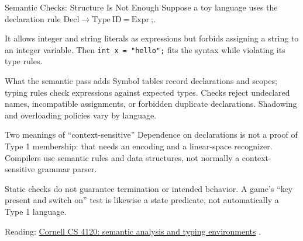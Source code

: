 \documentclass[10pt]{beamer}
\newcommand{\paperlink}[2]{%
  \href{#1}{\textcolor{blue!65!black}{#2}}%
}
\begin{document}
\begin{frame}{Semantic Checks: Structure Is Not Enough}
  \small
  Suppose a toy language uses the declaration rule
  $\mathrm{Decl}\to\mathrm{Type}\ \mathrm{ID}\ \texttt{=}\
      \mathrm{Expr}\ \texttt{;}$.
  \par\smallskip
  It allows integer and string literals as expressions but forbids assigning
  a string to an integer variable. Then \texttt{int x = "hello";}
  fits the syntax while violating its type rules.
  \pause
  \begin{block}{What the semantic pass adds}
    Symbol tables record declarations and scopes; typing rules check
    expressions against expected types. Checks reject undeclared names,
    incompatible assignments, or forbidden duplicate declarations.
    Shadowing and overloading policies vary by language.
  \end{block}
  \pause
  \begin{alertblock}{Two meanings of ``context-sensitive''}
    Dependence on declarations is not a proof of Type 1 membership: that
    needs an encoding and a linear-space recognizer. Compilers use semantic
    rules and data structures, not normally a context-sensitive grammar parser.
  \end{alertblock}
  Static checks do not guarantee termination or intended behavior.
  A game's ``key present and switch on'' test is likewise a state predicate,
  not automatically a Type 1 language.
  \par\smallskip
  {\scriptsize Reading: \paperlink{https://www.cs.cornell.edu/courses/cs4120/2026sp/notes/}
  {Cornell CS 4120: semantic analysis and typing environments}.}
\end{frame}
\end{document}

